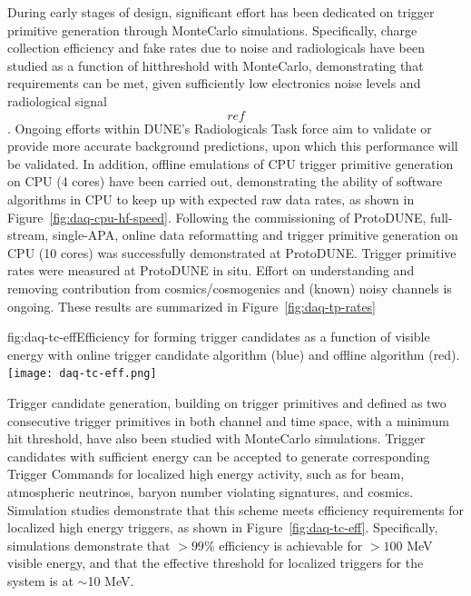During early stages of design, significant effort has been dedicated on trigger primitive generation
through MonteCarlo simulations. Specifically, charge collection efficiency and fake rates
due to noise and radiologicals have been studied as a function of
hitthreshold with MonteCarlo, demonstrating that requirements can be
met, given sufficiently low electronics noise levels and radiological
signal \[ref\]. Ongoing efforts within DUNE's Radiologicals Task force
aim to validate or provide more accurate background predictions, upon
which this performance will be validated. In addition, offline emulations
of CPU trigger primitive generation on CPU (4 cores) have been carried
out, demonstrating the ability of software algorithms in CPU to keep
up with expected raw data rates, as shown in Figure~\ref{fig:daq-cpu-hf-speed}. 
Following the commissioning of ProtoDUNE, full-stream, single-APA,
online data reformatting and trigger primitive generation on CPU (10 cores) was successfully
demonstrated at ProtoDUNE. Trigger primitive rates were measured at
ProtoDUNE in situ. Effort on understanding and removing contribution
from cosmics/cosmogenics and (known) noisy channels is ongoing.
These results are summarized in Figure~\ref{fig:daq-tp-rates}

\begin{dunefigure}{fig:daq-tc-eff}{Efficiency for forming trigger candidates as a function of visible energy with online trigger candidate algorithm (blue) and offline algorithm (red).}
  \texttt{[image: daq-tc-eff.png]}
\end{dunefigure}


Trigger candidate generation, building on trigger primitives and defined
as two consecutive trigger primitives in both channel and time space,
with a minimum hit threshold, have also been studied with MonteCarlo
simulations. Trigger candidates with sufficient energy can be accepted
to generate corresponding Trigger Commands for localized high energy
activity, such as for beam, atmospheric neutrinos, baryon number
violating signatures, and cosmics. Simulation studies demonstrate that
this scheme meets efficiency requirements for localized high energy
triggers, as shown in Figure~\ref{fig:daq-tc-eff}. Specifically,
simulations demonstrate that $>99$\% efficiency is achievable for
$>100$ MeV visible energy, and that the effective threshold for
localized triggers for the system is at $\sim$10 MeV. 

